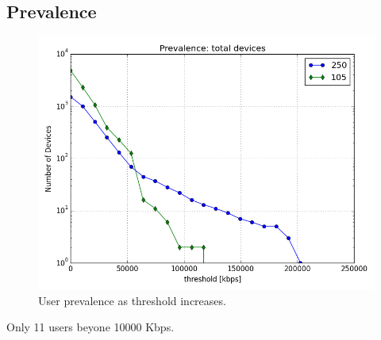 \subsection{Prevalence}\label{subsec:prevalence}

\begin{figure}[ht]
\begin{minipage}{\linewidth}
\centering
\includegraphics[width=\linewidth]{figures/prevalence.png}
\caption{User prevalence as threshold increases.}
\label{fig:prevalence}
\end{minipage}
\end{figure}

Only 11 users beyone 10000 Kbps.